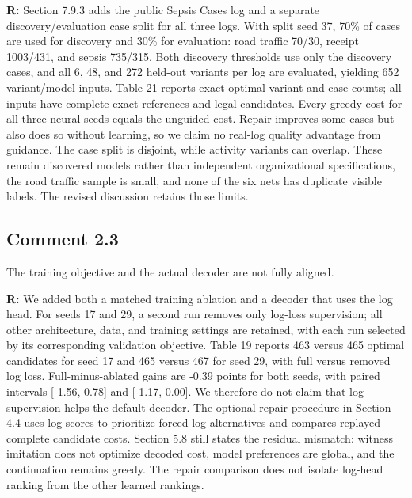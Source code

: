 \documentclass[11pt,a4paper]{article}
\newenvironment{reviewercomment}{%
  \begin{list}{}{\setlength{\leftmargin}{1.5em}%
    \setlength{\rightmargin}{0pt}\setlength{\topsep}{0.5em}}%
  \item\relax\color{reviewerred}\ignorespaces
}{\end{list}}
\begin{document}
{\color{black}\textbf{R:} Section 7.9.3 adds the public Sepsis Cases log and a separate discovery/evaluation case split for all three logs. With split seed 37, 70\% of cases are used for discovery and 30\% for evaluation: road traffic 70/30, receipt 1003/431, and sepsis 735/315. Both discovery thresholds use only the discovery cases, and all 6, 48, and 272 held-out variants per log are evaluated, yielding 652 variant/model inputs. Table 21 reports exact optimal variant and case counts; all inputs have complete exact references and legal candidates. Every greedy cost for all three neural seeds equals the unguided cost. Repair improves some cases but also does so without learning, so we claim no real-log quality advantage from guidance. The case split is disjoint, while activity variants can overlap. These remain discovered models rather than independent organizational specifications, the road traffic sample is small, and none of the six nets has duplicate visible labels. The revised discussion retains those limits.\par}

\subsection*{Comment 2.3}

\begin{reviewercomment}The training objective and the actual decoder are not fully aligned.\end{reviewercomment}

{\color{black}\textbf{R:} We added both a matched training ablation and a decoder that uses the log head. For seeds 17 and 29, a second run removes only log-loss supervision; all other architecture, data, and training settings are retained, with each run selected by its corresponding validation objective. Table 19 reports 463 versus 465 optimal candidates for seed 17 and 465 versus 467 for seed 29, with full versus removed log loss. Full-minus-ablated gains are -0.39 points for both seeds, with paired intervals [-1.56, 0.78] and [-1.17, 0.00]. We therefore do not claim that log supervision helps the default decoder. The optional repair procedure in Section 4.4 uses log scores to prioritize forced-log alternatives and compares replayed complete candidate costs. Section 5.8 still states the residual mismatch: witness imitation does not optimize decoded cost, model preferences are global, and the continuation remains greedy. The repair comparison does not isolate log-head ranking from the other learned rankings.\par}
\end{document}
